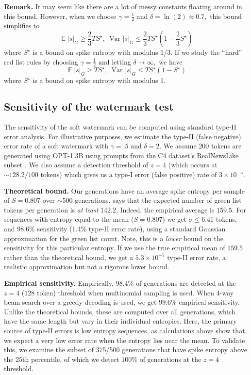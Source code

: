 \documentclass{article}
\theoremstyle{plain}
\theoremstyle{definition}
\theoremstyle{remark}
\DeclareMathOperator*{\expect}{\mathbb{E}}
\begin{document}
\noindent \textbf{Remark.}  It may seem like there are a lot of messy constants floating around in this bound. However, when we choose $\gamma=\frac{1}{2}$ and $\delta = \ln(2) \approx 0.7,$ this bound simplifies to
$$
\expect |s|_G  \ge \frac{2}{3}T S^\star, \,\,\, \text{Var}\,\, |s|_G \le \frac{2}{3}T  S^\star   \left(1- \frac{2}{3} S^\star  \right)
$$
where $S^\star$ is a bound on spike entropy with modulus 1/3.
If we study the ``hard'' red list rules by choosing $\gamma=\frac{1}{2}$ and letting $\delta \to \infty,$ we have 
$$
\expect |s|_G  \ge T S^\star, \,\,\, \text{Var}\,\, |s|_G \le T S^\star   \left(1- S^\star  \right)
$$
where $S^\star$ is a bound on spike entropy with modulus 1. 

\subsection{Sensitivity of the watermark test}\label{sec:sensitivity}
The sensitivity of the soft watermark can be computed using standard type-II error analysis. For illustrative purposes, we estimate the type-II (false negative) error rate of a soft watermark with $\gamma=.5$ and $\delta=2.$ We assume 200 tokens are generated using OPT-1.3B \citep{zhang2022opt} using prompts from the C4 dataset's RealNewsLike subset \citep{2019t5}. We also assume a detection threshold of $z=4$ (which occurs at $\sim128.2/100$ tokens) which gives us a type-I error (false positive) rate of $3\times 10^{-5}$. 

\textbf{Theoretical bound.} 
 Our generations have an average spike entropy per sample of $S=0.807$ over $\sim500$ generations.  says that the expected number of green list tokens per generation is {\em at least} $142.2$. Indeed, the empirical average is $159.5$. For sequences with entropy equal to the mean ($S=0.807$) we get $\sigma\le 6.41$ tokens, and
98.6\% sensitivity (1.4\% type-II error rate), using a standard Gaussian approximation for the green list count. Note, this is a {\em lower} bound on the sensitivity for this particular entropy. If we use the true empirical mean of $159.5$ rather than the theoretical bound, we get a $5.3\times 10^{-7}$ type-II error rate, a realistic approximation but not a rigorous lower bound. 

\textbf{Empirical sensitivity.} Empirically, $98.4\%$ of generations are detected at the $z=4$ ($128$ token) threshold when multinomial sampling is used.  When $4$-way beam search over a greedy decoding is used, we get $99.6\%$ empirical sensitivity. Unlike the theoretical bounds, these are computed over all generations, which have the same length but vary in their individual entropies. Here, the primary source of type-II errors is low entropy sequences, as calculations above show that we expect a very low error rate when the entropy lies near the mean. To validate this, we examine the subset of 375/500 generations that have spike entropy above the $25$th percentile, of which we detect $100\%$ of generations at the $z=4$ threshold.
\end{document}
